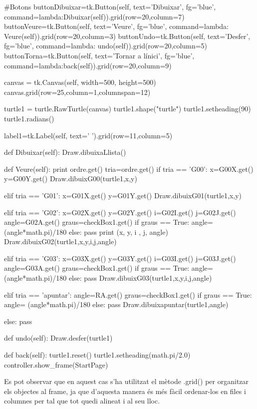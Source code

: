 \begin{python}
	#Botons
	buttonDibuixar=tk.Button(self, text='Dibuixar', fg='blue', command=lambda:Dibuixar(self)).grid(row=20,column=7)
	buttonVeure=tk.Button(self, text='Veure', fg='blue', command=lambda: Veure(self)).grid(row=20,column=3)
	buttonUndo=tk.Button(self, text='Desfer', fg='blue', command=lambda: undo(self)).grid(row=20,column=5)
	buttonTorna=tk.Button(self, text='Tornar a l\'inici', fg='blue', command=lambda:back(self)).grid(row=20,column=9)
	
	canvas = tk.Canvas(self, width=500, height=500)
	canvas.grid(row=25,column=1,columnspan=12)
	
	turtle1 = turtle.RawTurtle(canvas)
	turtle1.shape("turtle")
	turtle1.setheading(90)
	turtle1.radians()
	
	label1=tk.Label(self, text='          ').grid(row=11,column=5)
	
	
	
	
	def Dibuixar(self):
	Draw.dibuixaLlista()
	
	
	def Veure(self):
	print ordre.get()
	tria=ordre.get()
	if tria == 'G00':
	x=G00X.get()
	y=G00Y.get()
	Draw.dibuixG00(turtle1,x,y)
	
	elif tria == 'G01':
	x=G01X.get()
	y=G01Y.get()
	Draw.dibuixG01(turtle1,x,y)
	
	elif tria == 'G02':
	x=G02X.get()
	y=G02Y.get()
	i=G02I.get()
	j=G02J.get()
	angle=G02A.get()
	graus=checkBox1.get()
	if graus == True:
	angle= (angle*math.pi)/180
	else:
	pass
	print (x, y, i , j, angle)
	Draw.dibuixG02(turtle1,x,y,i,j,angle)
	
	elif tria == 'G03':
	x=G03X.get()
	y=G03Y.get()
	i=G03I.get()
	j=G03J.get()
	angle=G03A.get()
	graus=checkBox1.get()
	if graus == True:
	angle= (angle*math.pi)/180
	else:
	pass
	Draw.dibuixG03(turtle1,x,y,i,j,angle)
	
	elif tria == 'apuntar':
	angle=RA.get()
	graus=checkBox1.get()
	if graus == True:
	angle= (angle*math.pi)/180
	else:
	pass
	Draw.dibuixapuntar(turtle1,angle)
	
	else:
	pass
	
	def undo(self):
	Draw.desfer(turtle1)
	
	
	def back(self):
	turtle1.reset()
	turtle1.setheading(math.pi/2.0)
	controller.show_frame(StartPage)
\end{python}

Es pot observar que en aquest cas s’ha utilitzat el mètode .grid() per organitzar els objectes al frame, ja que d’aquesta manera és més fàcil ordenar-los en files i columnes per tal que tot quedi alineat i al seu lloc.


